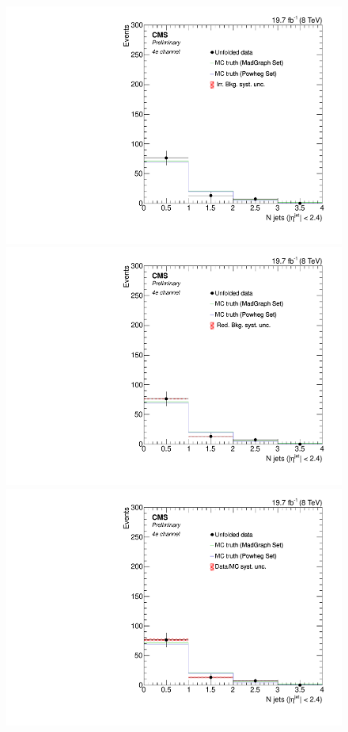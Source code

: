\begin{figure}[hbtp]
\begin{center}
    \includegraphics[width=0.8\cmsFigWidth]{Figures/Unfolding/Systematics/ZZTo4e_CentralJets_IrrBkg_Mad_fr}
    \includegraphics[width=0.8\cmsFigWidth]{Figures/Unfolding/Systematics/ZZTo4e_CentralJets_RedBkg_Mad_fr}     
    \includegraphics[width=0.8\cmsFigWidth]{Figures/Unfolding/Systematics/ZZTo4e_CentralJets_UnfDataOverGenMC_Mad_fr}     

\end{center}
\end{figure}
